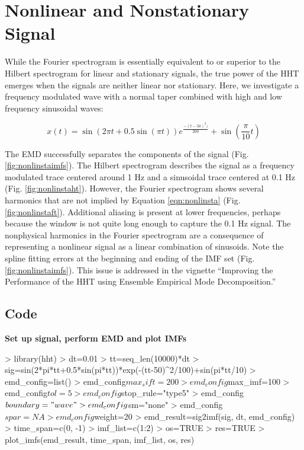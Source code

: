 \documentclass[12pt]{article}
\begin{document}
\FloatBarrier

\section{Nonlinear and Nonstationary Signal}

While the Fourier spectrogram is essentially equivalent to or superior to the Hilbert spectrogram for linear and stationary signals,
the true power of the HHT emerges when the signals are neither linear nor stationary.
Here, we investigate a frequency modulated wave with a normal taper combined with high and low frequency sinusoidal waves:

\begin{equation}
\label{eqn:nonlinsta}
x (t) = \sin(2\pi t+0.5\sin(\pi t))e^{\frac{-(t-50)^{2})}{200}} + \sin(\frac{\pi}{10} t)
\end{equation}

The EMD successfully separates the components of the signal (Fig. \ref{fig:nonlinstaimfs}).
The Hilbert spectrogram describes the signal as a frequency modulated trace centered around 1 Hz and a 
sinusoidal trace centered at 0.1 Hz (Fig. \ref{fig:nonlinstaht}).
However, the Fourier spectrogram shows several harmonics that are not implied by Equation \ref{eqn:nonlinsta} (Fig. \ref{fig:nonlinstaft}).
Additional aliasing is present at lower frequencies, perhaps because the window is not quite long enough to capture the 0.1 Hz signal.
The nonphysical harmonics in the Fourier spectrogram are a consequence of representing a nonlinear signal as a linear combination of sinusoids.
Note the spline fitting errors at the beginning and ending of the IMF set (Fig. \ref{fig:nonlinstaimfs}).
This issue is addressed in the vignette ``Improving the Performance of the HHT using Ensemble Empirical Mode Decomposition.''

\subsection{Code}

\textbf{Set up signal, perform EMD and plot IMFs}
\begin{Schunk}
\begin{Sinput}
> library(hht)
> dt=0.01
> tt=seq_len(10000)*dt
> sig=sin(2*pi*tt+0.5*sin(pi*tt))*exp(-(tt-50)^2/100)+sin(pi*tt/10)
> emd_config=list()
> emd_config$max_sift=200
> emd_config$max_imf=100
> emd_config$tol=5
> emd_config$stop_rule="type5"
> emd_config$boundary="wave"
> emd_config$sm="none"
> emd_config$spar=NA
> emd_config$weight=20
> emd_result=sig2imf(sig, dt, emd_config)
> time_span=c(0, -1)
> imf_list=c(1:2)
> os=TRUE
> res=TRUE
> plot_imfs(emd_result, time_span, imf_list, os, res)
\end{Sinput}
\end{Schunk}
\end{document}
